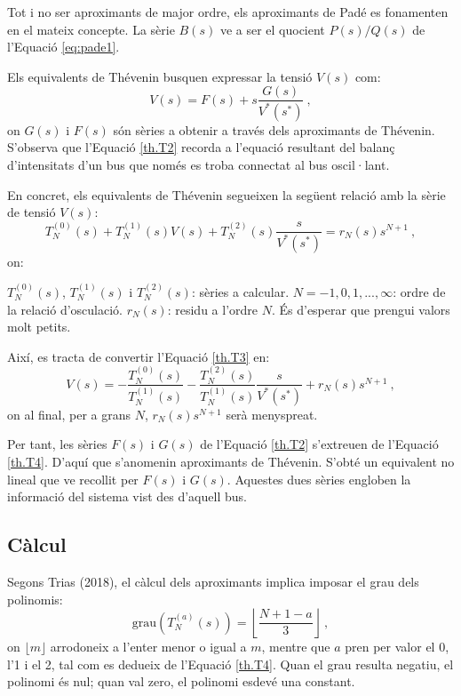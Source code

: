 Tot i no ser aproximants de major ordre, els aproximants de Padé es fonamenten en el mateix concepte. La sèrie $B(s)$ ve a ser el quocient $P(s)/Q(s)$ de l'Equació \ref{eq:pade1}.

Els equivalents de Thévenin busquen expressar la tensió $V(s)$ com:
\begin{equation}
V(s)=F(s)+s\frac{G(s)}{V^*(s^*)}\ ,
\label{th.T2}
\end{equation}
on $G(s)$ i $F(s)$ són sèries a obtenir a través dels aproximants de Thévenin. S'observa que l'Equació \ref{th.T2} recorda a l'equació resultant del balanç d'intensitats d'un bus que només es troba connectat al bus oscil·lant. 

En concret, els equivalents de Thévenin segueixen la següent relació amb la sèrie de tensió $V(s)$: 
\begin{equation}
    T^{(0)}_N(s)+T^{(1)}_N(s)V(s)+T^{(2)}_N(s)\frac{s}{V^*(s^*)}=r_N(s)s^{N+1}\ ,
    \label{th.T3}
\end{equation}
on:

$T^{(0)}_N(s)$, $T^{(1)}_N(s)$ i $T^{(2)}_N(s)$: sèries a calcular.
\vs
$N=-1,0,1,...,\infty$: ordre de la relació d'osculació.
\vs
$r_N(s)$: residu a l'ordre $N$. És d'esperar que prengui valors molt petits.

Així, es tracta de convertir l'Equació \ref{th.T3} en:
\begin{equation}
V(s)=-\frac{T^{(0)}_N(s)}{T^{(1)}_N(s)}-\frac{T^{(2)}_N(s)}{T^{(1)}_N(s)}\frac{s}{V^*(s^*)}+r_N(s)s^{N+1}\ ,
\label{th.T4}
\end{equation}
on al final, per a grans $N$, $r_N(s)s^{N+1}$ serà menyspreat. 

Per tant, les sèries $F(s)$ i $G(s)$ de l'Equació \ref{th.T2} s'extreuen de l'Equació \ref{th.T4}. D'aquí que s'anomenin aproximants de Thévenin. S'obté un equivalent no lineal que ve recollit per $F(s)$ i $G(s)$. Aquestes dues sèries engloben la informació del sistema vist des d'aquell bus. 

\subsection{Càlcul}
Segons Trias (2018), el càlcul dels aproximants implica imposar el grau dels polinomis:
\begin{equation}
    \text{grau}(T^{(a)}_N(s))=\left\lfloor\frac{N+1-a}{3}\right\rfloor\ ,
    \label{th.T5}
\end{equation}
on $\lfloor m\rfloor$ arrodoneix a l'enter menor o igual a $m$, mentre que $a$ pren per valor el 0, l'1 i el 2, tal com es dedueix de l'Equació \ref{th.T4}. Quan el grau resulta negatiu, el polinomi és nul; quan val zero, el polinomi esdevé una constant.

